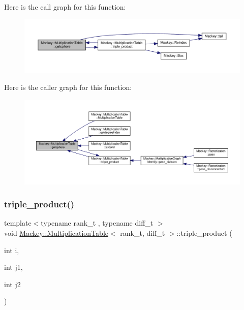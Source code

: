Here is the call graph for this function\+:\nopagebreak
\begin{figure}[H]
\begin{center}
\leavevmode
\includegraphics[width=350pt]{classMackey_1_1MultiplicationTable_ad4245f4a8122f0661f969498ef53f999_cgraph}
\end{center}
\end{figure}
Here is the caller graph for this function\+:\nopagebreak
\begin{figure}[H]
\begin{center}
\leavevmode
\includegraphics[width=350pt]{classMackey_1_1MultiplicationTable_ad4245f4a8122f0661f969498ef53f999_icgraph}
\end{center}
\end{figure}
\mbox{\label{classMackey_1_1MultiplicationTable_ae2801cd35f426f10c89ab8addb75f829}} 
\subsubsection{\texorpdfstring{triple\+\_\+product()}{triple\_product()}}
{\footnotesize\ttfamily template$<$typename rank\+\_\+t , typename diff\+\_\+t $>$ \\
void \hyperlink{classMackey_1_1MultiplicationTable}{Mackey\+::\+Multiplication\+Table}$<$ rank\+\_\+t, diff\+\_\+t $>$\+::triple\+\_\+product (\begin{DoxyParamCaption}\item[{int}]{i,  }\item[{int}]{j1,  }\item[{int}]{j2 }\end{DoxyParamCaption})\hspace{0.3cm}{\ttfamily [protected]}}



